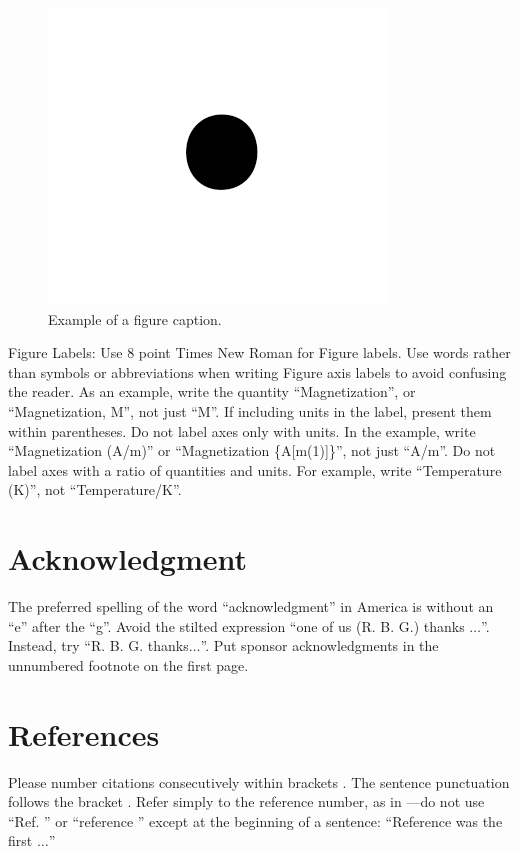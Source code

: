 \documentclass[conference]{IEEEtran}
\begin{document}
\begin{figure}[htbp]
\centerline{\includegraphics{fig1.png}}
\caption{Example of a figure caption.}
\label{fig}
\end{figure}

Figure Labels: Use 8 point Times New Roman for Figure labels. Use words 
rather than symbols or abbreviations when writing Figure axis labels to 
avoid confusing the reader. As an example, write the quantity 
``Magnetization'', or ``Magnetization, M'', not just ``M''. If including 
units in the label, present them within parentheses. Do not label axes only 
with units. In the example, write ``Magnetization (A/m)'' or ``Magnetization 
\{A[m(1)]\}'', not just ``A/m''. Do not label axes with a ratio of 
quantities and units. For example, write ``Temperature (K)'', not 
``Temperature/K''.

\section*{Acknowledgment}

The preferred spelling of the word ``acknowledgment'' in America is without 
an ``e'' after the ``g''. Avoid the stilted expression ``one of us (R. B. 
G.) thanks $\ldots$''. Instead, try ``R. B. G. thanks$\ldots$''. Put sponsor 
acknowledgments in the unnumbered footnote on the first page.

\section*{References}

Please number citations consecutively within brackets  . The 
sentence punctuation follows the bracket  . Refer simply to the reference 
number, as in  ---do not use ``Ref.  '' or ``reference  '' except at 
the beginning of a sentence: ``Reference   was the first $\ldots$''
\end{document}
